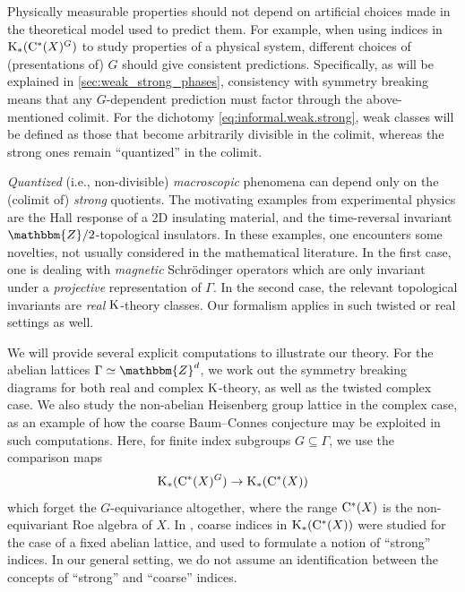 \documentclass{amsart}
\numberwithin{figure}{section}
\numberwithin{equation}{section}
\numberwithin{table}{section}
\theoremstyle{plain}
\theoremstyle{definition}
\theoremstyle{remark}
\theoremstyle{nonumber}
\newcommand{\Z}{\mathbb{Z}}
\newcommand{\K}{\relax\ifmmode\operatorname{K}\else\textup{K}\fi}
\newcommand{\Cst}{\relax\ifmmode\mathrm{C}^*\else\textup{C*}\fi}
\renewcommand{\mathbb}{\mathbbm} %
\begin{document}
Physically measurable properties should not depend on artificial choices
made in the theoretical model used to predict them. For example, when
using indices in $\K_*(\Cst(X)^G)$ to study properties of a physical
system, different choices of (presentations of) $G$ should give
consistent predictions. Specifically, as will be explained in
\cref{sec:weak_strong_phases}, consistency with symmetry breaking
means that any $G$-dependent prediction must factor through the
above-mentioned colimit.
For the
dichotomy \eqref{eq:informal.weak.strong}, weak classes 
will be defined as those that
become arbitrarily divisible in the colimit, whereas the strong ones remain
``quantized'' in the colimit. 

\emph{Quantized} (i.e., non-divisible) \emph{macroscopic}
phenomena can depend only on the (colimit of) \emph{strong} quotients. The
motivating examples from experimental physics are the Hall response of a 2D
insulating material, and the time-reversal invariant
$\Z/2$-topological insulators. In these examples, one encounters some novelties, not usually considered in the mathematical literature. In
the first case, one is dealing with \emph{magnetic} Schr\"{o}dinger
operators which are only invariant under a \emph{projective} representation
of $\Gamma$. In the second case, the relevant topological invariants are
\emph{real} $\K$-theory classes. Our formalism applies in
such twisted or real settings as well.

We will provide several explicit computations to illustrate our
theory. For the abelian lattices $\Gamma\simeq\Z^d$, we work out the
symmetry breaking diagrams for both real and complex $\K$-theory, as well
as the twisted complex case. We also study the non-abelian Heisenberg group
lattice in the complex case, as an example of how the coarse Baum--Connes
conjecture may be exploited in such computations. Here, for finite index subgroups $G\subseteq \Gamma$, we use the
comparison maps
\begin{equation}\label{eq:comparison.to.coarse}
\K_*(\Cst(X)^G)\to \K_*(\Cst(X))
\end{equation}
which forget the $G$-equivariance altogether, where the range \( \Cst(X) \)
is the non-equivariant Roe algebra of \( X \). In
\cite{Ewert-Meyer:Coarse_geometry}, coarse indices in $\K_*(\Cst(X))$
were studied for the case of a fixed abelian lattice, and used to formulate
a notion of ``strong'' indices. In our general setting, we do not assume an
identification between the concepts of ``strong'' and ``coarse'' indices. 
\end{document}
